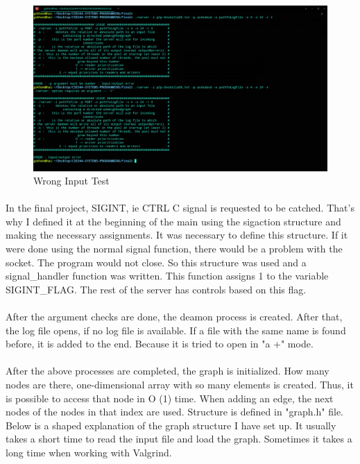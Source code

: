 \documentclass[a4paper,12pt]{report}
\begin{document}
\begin{figure}[h!]
\centering
\includegraphics[scale=0.25]{1_wrongınput.png}
\caption{Wrong Input Test}
\label{fig:compile}
\end{figure}

\newpage
\paragraph{}
In the final project, SIGINT, ie CTRL C signal is requested to be catched. That's why I defined it at the beginning of the main using the sigaction structure and making the necessary assignments. It was necessary to define this structure. If it were done using the normal signal function, there would be a problem with the socket. The program would not close. So this structure was used and a signal\_handler function was written. This function assigns 1 to the variable SIGINT\_FLAG. The rest of the server has controls based on this flag.

\paragraph{}
After the argument checks are done, the deamon process is created. After that, the log file opens, if no log file is available. If a file with the same name is found before, it is added to the end. Because it is tried to open in "a +" mode.

\paragraph{}
After the above processes are completed, the graph is initialized. How many nodes are there, one-dimensional array with so many elements is created. Thus, it is possible to access that node in O (1) time. When adding an edge, the next nodes of the nodes in that index are used. Structure is defined in "graph.h" file. Below is a shaped explanation of the graph structure I have set up. It usually takes a short time to read the input file and load the graph. Sometimes it takes a long time when working with Valgrind.
\end{document}
